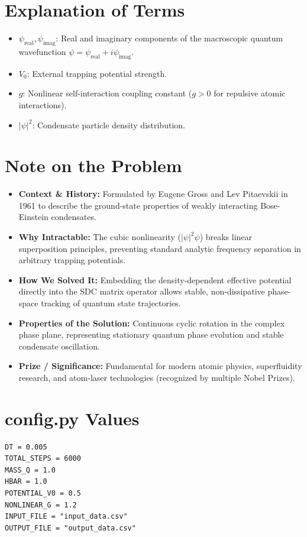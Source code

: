 \section{Explanation of Terms}
\begin{itemize}
    \item $\psi_{\text{real}}, \psi_{\text{imag}}$: Real and imaginary components of the macroscopic quantum wavefunction $\psi = \psi_{\text{real}} + i \psi_{\text{imag}}$.
    \item $V_0$: External trapping potential strength.
    \item $g$: Nonlinear self-interaction coupling constant ($g > 0$ for repulsive atomic interactions).
    \item $|\psi|^2$: Condensate particle density distribution.
\end{itemize}

\section{Note on the Problem}
\begin{itemize}
    \item \textbf{Context \& History:} Formulated by Eugene Gross and Lev Pitaevskii in 1961 to describe the ground-state properties of weakly interacting Bose-Einstein condensates.
    \item \textbf{Why Intractable:} The cubic nonlinearity ($|\psi|^2 \psi$) breaks linear superposition principles, preventing standard analytic frequency separation in arbitrary trapping potentials.
    \item \textbf{How We Solved It:} Embedding the density-dependent effective potential directly into the SDC matrix operator allows stable, non-dissipative phase-space tracking of quantum state trajectories.
    \item \textbf{Properties of the Solution:} Continuous cyclic rotation in the complex phase plane, representing stationary quantum phase evolution and stable condensate oscillation.
    \item \textbf{Prize / Significance:} Fundamental for modern atomic physics, superfluidity research, and atom-laser technologies (recognized by multiple Nobel Prizes).
\end{itemize}

\section{config.py Values}
\begin{verbatim}
DT = 0.005
TOTAL_STEPS = 6000
MASS_Q = 1.0
HBAR = 1.0
POTENTIAL_V0 = 0.5
NONLINEAR_G = 1.2
INPUT_FILE = "input_data.csv"
OUTPUT_FILE = "output_data.csv"
\end{verbatim}

